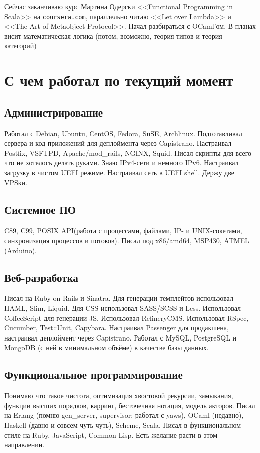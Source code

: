 \documentclass[14pt,a4paper]{extarticle}
\begin{document}
Сейчас заканчиваю курс Мартина Одерски <<Functional Programming in
Scala>> на {\tt coursera.com}, параллельно читаю <<Let over Lambda>> и
<<The Art of Metaobject Protocol>>. Начал разбираться с OCaml'ом. В
планах висит математическая логика (потом, возможно, теория типов и теория
категорий)

\section*{С чем работал по текущий момент}

\subsection*{Администрирование}

Работал с Debian, Ubuntu, CentOS, Fedora, SuSE,
Archlinux. Подготавливал сервера и код приложений для деплоймента через
Capistrano. Настраивал Postfix, VSFTPD, Apache/mod\_rails, NGINX,
Squid. Писал скрипты для всего что не хотелось делать
руками. Знаю IPv4-сети и немного IPv6. Настраивал загрузку в чистом
UEFI режиме. Настраивал сеть в UEFI shell. Держу две VPSки.

\subsection*{Системное ПО}

C89, C99, POSIX API(работа с процессами, файлами, IP- и UNIX-сокетами,
синхронизация процессов и потоков). Писал под x86/amd64, MSP430, ATMEL (Arduino).

\subsection*{Веб-разработка}

Писал на Ruby on Rails и Sinatra. Для генерации темплейтов использовал
HAML, Slim, Liquid. Для CSS использовал SASS/SCSS и Less. Использовал
CoffeeScript для генерации JS. Использовал RefineryCMS. Использовал
RSpec, Cucumber, Test::Unit, Capybara. Настраивал Passenger для
продакшена, настраивал деплоймент через Capistrano. Работал с MySQL,
PostgreSQL и MongoDB (с ней в минимальном объёме) в качестве базы
данных.

\subsection*{Функциональное программирование}

Понимаю что такое чистота, оптимизация хвостовой рекурсии, замыкания,
функции высших порядков, карринг, бесточечная нотация, модель акторов.
Писал на Erlang (помню gen\_server, supervisor; работал с yaws), OCaml (недавно),
Haskell (давно и совсем чуть-чуть), Scheme, Scala. Писал в функциональном стиле
на Ruby, JavaScript, Common Lisp. Есть желание расти в этом направлении.
\end{document}
